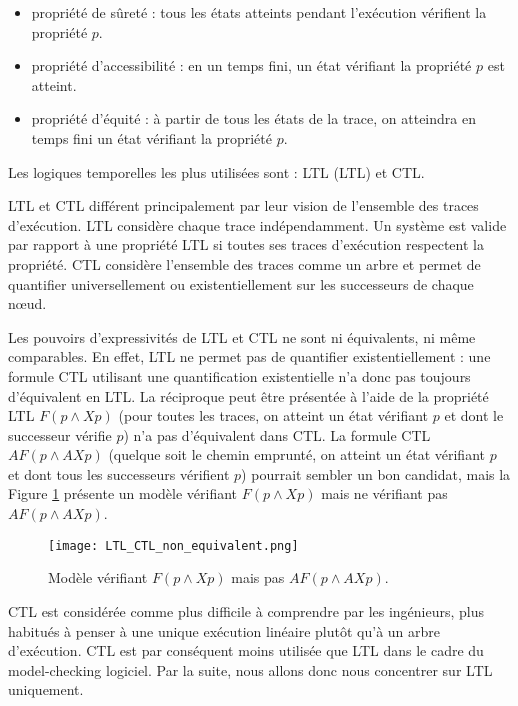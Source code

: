 \begin{itemize}
\item
  propriété de sûreté : tous les états atteints pendant l'exécution
  vérifient la propriété \(p\).
\item
  propriété d'accessibilité : en un temps fini, un état vérifiant la
  propriété \(p\) est atteint.
\item
  propriété d'équité : à partir de tous les états de la trace, on
  atteindra en temps fini un état vérifiant la propriété \(p\).
\end{itemize}

Les logiques temporelles les plus utilisées sont : \acl{LTL} (\ac{LTL})
et \ac{CTL}.

\ac{LTL} et \ac{CTL} différent principalement par leur vision de l'ensemble des
traces d'exécution. \ac{LTL} considère chaque trace indépendamment. Un
système est valide par rapport à une propriété \ac{LTL} si toutes ses traces
d'exécution respectent la propriété. \ac{CTL} considère l'ensemble des traces
comme un arbre et permet de quantifier universellement
ou existentiellement sur les successeurs de chaque nœud.

Les pouvoirs d'expressivités de \ac{LTL} et \ac{CTL} ne sont ni équivalents, ni même
comparables. En effet, \ac{LTL} ne permet pas de quantifier existentiellement :
une formule \ac{CTL} utilisant une quantification existentielle n'a donc pas
toujours d'équivalent en \ac{LTL}. La réciproque peut être présentée à l'aide de
la propriété \ac{LTL} \(F (p \land X p)\) (pour toutes les traces, on atteint un
état vérifiant \(p\) et dont le successeur vérifie \(p\)) n'a pas d'équivalent
dans \ac{CTL}. La formule \ac{CTL} \(AF (p \land AX p)\) (quelque soit le chemin
emprunté, on atteint un état vérifiant \(p\) et dont tous les successeurs
vérifient \(p\)) pourrait sembler un bon candidat, mais la Figure
\ref{LTL_vs_CTL} présente un modèle vérifiant \(F (p \land X p)\) mais ne
vérifiant pas \(AF (p \land AX p)\).

\begin{figure}
\begin{center}
\texttt{[image: LTL\_CTL\_non\_equivalent.png]}
\caption{Modèle vérifiant \(F (p \land X p)\) mais pas \(AF (p \land AX p)\).}
\label{LTL_vs_CTL}
\end{center}
\end{figure}

\ac{CTL} est considérée comme plus difficile à comprendre par les ingénieurs,
plus habitués à penser à une unique exécution linéaire plutôt qu'à un arbre
d'exécution\cite{RCTL_formulas}. \ac{CTL} est par conséquent moins utilisée que
\ac{LTL} dans le cadre du model-checking logiciel. Par la suite, nous allons
donc nous concentrer sur \ac{LTL} uniquement.

